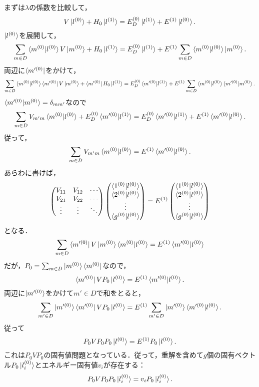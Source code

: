 \documentclass[a4paper]{ltjsreport}
\begin{document}
まずは$\lambda$の係数を比較して，
\[V \ket{l^{(0)}} + H_0\ket{l^{(1)}} = E_D^{(0)} \ket{l^{(1)}} + E^{(1)} \ket{l^{(0)}}.\]
$\ket{l^{(0)}}$を展開して，
\[\sum_{m \in D} \braket{m^{(0)} | l^{(0)}} V \ket{m^{(0)}} + H_0\ket{l^{(1)}} = E_D^{(0)} \ket{l^{(1)}} + E^{(1)} \sum_{m \in D} \braket{m^{(0)} | l^{(0)}} \ket{m^{(0)}}.\]
両辺に$\bra{m'^{(0)}}$をかけて，
\[\sum_{m \in D} \braket{m^{(0)} | l^{(0)}} \bra{m'^{(0)}} V \ket{m^{(0)}} + \bra{m'^{(0)}} H_0 \ket{l^{(1)}} = E_D^{(0)} \braket{m'^{(0)} | l^{(1)}} + E^{(1)} \sum_{m \in D} \braket{m^{(0)} | l^{(0)}} \braket{m'^{(0)} | m^{(0)}}.\]
$\braket{m'^{(0)} | m^{(0)}} = \delta_{mm'}$なので
\[\sum_{m \in D} V_{m'm} \braket{m^{(0)} | l^{(0)}} + E_D^{(0)} \braket{m'^{(0)} | l^{(1)}} = E_D^{(0)} \braket{m'^{(0)} | l^{(1)}} + E^{(1)} \braket{m'^{(0)} | l^{(0)}}.\]
従って，
\[\sum_{m \in D} V_{m'm} \braket{m^{(0)} | l^{(0)}} = E^{(1)} \braket{m'^{(0)} | l^{(0)}}.\]
あらわに書けば，
\[
\begin{pmatrix}
  V_{11} & V_{12} & \cdots \\
  V_{21} & V_{22} & \cdots \\
  \vdots & \vdots & \ddots
\end{pmatrix}
\begin{pmatrix}
  \braket{1^{(0)} | l^{(0)}} \\
  \braket{2^{(0)} | l^{(0)}} \\
  \vdots \\
  \braket{g^{(0)} | l^{(0)}}
\end{pmatrix}
= E^{(1)}
\begin{pmatrix}
  \braket{1^{(0)} | l^{(0)}} \\
  \braket{2^{(0)} | l^{(0)}} \\
  \vdots \\
  \braket{g^{(0)} | l^{(0)}}
\end{pmatrix}
\]
となる．
\[\sum_{m \in D} \bra{m'^{(0)}} V\ket{m^{(0)}} \braket{m^{(0)} | l^{(0)}} = E^{(1)} \braket{m'^{(0)} | l^{(0)}} \]
だが，$P_0 = \sum_{m \in D} \ket{m^{(0)}} \bra{m^{(0)}}$なので，
\[\bra{m'^{(0)}} VP_0 \ket{l^{(0)}} = E^{(1)} \braket{m'^{(0)} | l^{(0)}}.\]
両辺に$\ket{m'^{(0)}}$をかけて$m' \in D$で和をとると，
\[\sum_{m'\in D} \ket{m'^{(0)}} \bra{m'^{(0)}} VP_0 \ket{l^{(0)}} = E^{(1)} \sum_{m' \in D} \ket{m'^{(0)}} \braket{m'^{(0)} | l^{(0)}}.\]
従って
\[P_0VP_0P_0 \ket{l^{(0)}} = E^{(1)} P_0 \ket{l^{(0)}}.\]
これは$P_0VP_0$の固有値問題となっている．従って，重解を含めて$g$個の固有ベクトル$P_0\ket{l^{(0)}_i}$とエネルギー固有値$v_i$が存在する：
\[P_0VP_0P_0 \ket{l^{(0)}_i} = v_iP_0 \ket{l^{(0)}_i}.\]
\end{document}
